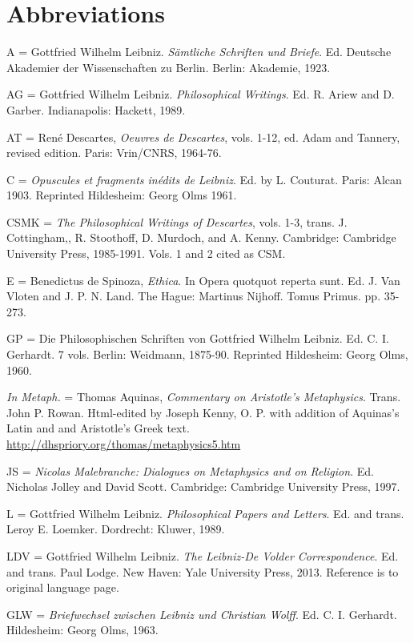\documentclass[]{article}
\begin{document}
\section{Abbreviations}

A = Gottfried Wilhelm Leibniz. \emph{Sämtliche Schriften und Briefe}.
Ed. Deutsche Akademier der Wissenschaften zu Berlin. Berlin: Akademie,
1923.

AG = Gottfried Wilhelm Leibniz. \emph{Philosophical Writings}. Ed. R.
Ariew and D. Garber. Indianapolis: Hackett, 1989.

AT = René Descartes, \emph{Oeuvres de Descartes}, vols. 1-12, ed. Adam
and Tannery, revised edition. Paris: Vrin/CNRS, 1964-76.

C = \emph{Opuscules et fragments inédits de Leibniz}. Ed. by L.
Couturat. Paris: Alcan 1903. Reprinted Hildesheim: Georg Olms 1961.

CSMK = \emph{The Philosophical Writings of Descartes}, vols. 1-3, trans.
J. Cottingham,, R. Stoothoff, D. Murdoch, and A. Kenny. Cambridge:
Cambridge University Press, 1985-1991. Vols. 1 and 2 cited as CSM.

E = Benedictus de Spinoza, \emph{Ethica}. In Opera quotquot reperta
sunt. Ed. J. Van Vloten and J. P. N. Land. The Hague: Martinus Nijhoff.
Tomus Primus. pp. 35-273.

GP = Die Philosophischen Schriften von Gottfried Wilhelm Leibniz. Ed. C.
I. Gerhardt. 7 vols. Berlin: Weidmann, 1875-90. Reprinted Hildesheim:
Georg Olms, 1960.

\emph{In Metaph.} = Thomas Aquinas, \emph{Commentary on Aristotle's
	Metaphysics}. Trans. John P. Rowan. Html-edited by Joseph Kenny, O. P.
with addition of Aquinas's Latin and and Aristotle's Greek text.
\url{http://dhspriory.org/thomas/metaphysics5.htm}

JS = \emph{Nicolas Malebranche: Dialogues on Metaphysics and on
	Religion}. Ed. Nicholas Jolley and David Scott. Cambridge: Cambridge
University Press, 1997.

L = Gottfried Wilhelm Leibniz. \emph{Philosophical Papers and Letters}.
Ed. and trans. Leroy E. Loemker. Dordrecht: Kluwer, 1989.

LDV = Gottfried Wilhelm Leibniz. \emph{The Leibniz-De Volder
	Correspondence}. Ed. and trans. Paul Lodge. New Haven: Yale University
Press, 2013. Reference is to original language page.

GLW = \emph{Briefwechsel zwischen Leibniz und Christian Wolff}. Ed. C.
I. Gerhardt. Hildesheim: Georg Olms, 1963.
\end{document}
